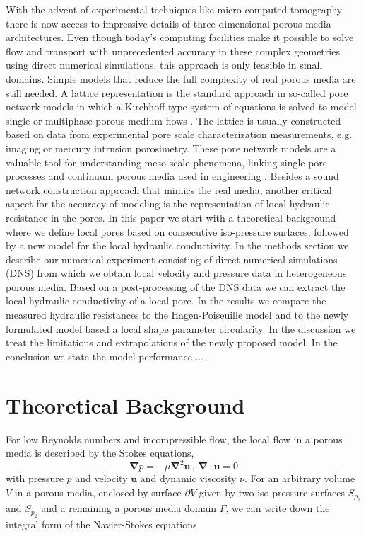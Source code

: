 \documentclass[draft]{agujournal2019}
\begin{document}
With the advent of experimental techniques like micro-computed tomography there is now access to impressive details of three dimensional porous media architectures. Even though today’s computing facilities make it possible to solve flow and transport with unprecedented accuracy in these complex geometries using direct numerical simulations, this approach is only feasible in small domains. Simple models that reduce the full complexity of real porous media are still needed. A lattice representation is the standard approach in so-called pore network models in which a Kirchhoff-type system of equations is solved to model single or multiphase porous medium flows . The lattice is usually constructed based on data from experimental pore scale characterization measurements, e.g. imaging or mercury intrusion porosimetry. These pore network models are a valuable tool for understanding meso-scale phenomena, linking single pore processes and continuum porous media used in engineering . Besides a sound network construction approach that mimics the real media, another critical aspect for the accuracy of modeling is the representation of local hydraulic resistance in the pores. 
In this paper we start with a theoretical background where we define local pores based on consecutive iso-pressure surfaces, followed by a new model for the local hydraulic conductivity. In the methods section we describe our numerical experiment consisting of direct numerical simulations (DNS) from which we obtain local velocity and pressure data in heterogeneous porous media. Based on a post-processing of the DNS data we can extract the local hydraulic conductivity of a local pore. In the results we compare the measured hydraulic resistances to the Hagen-Poiseuille model and to the newly formulated model based a local shape parameter circularity. In the discussion we treat the limitations and extrapolations of the newly proposed model. In the conclusion we state the model performance ... . 



\section{Theoretical Background}

For low Reynolds numbers and incompressible flow, the local flow in a porous media is described by the Stokes equations,
\begin{equation}
	\mathbf{\nabla} p = - \mu\mathbf{\nabla}^2 \mathbf{u}\,,\,\mathbf{\nabla}\cdot\mathbf{u}=0\label{eq:stokes_local}
	\end{equation}
with pressure $p$ and velocity $\mathbf{u}$ and dynamic viscosity $\nu$. For an arbitrary volume $V$ in a porous media, enclosed by surface $\partial V$ given by two iso-pressure surfaces $S_{p_1}$ and $S_{p_2}$ and a remaining a porous media domain $\Gamma$, we can write down the integral form of the Navier-Stokes equations
{}
\end{document}
